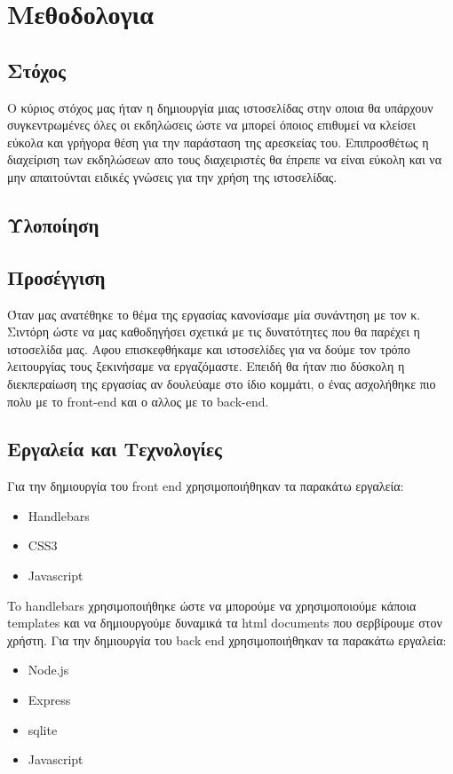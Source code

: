 \documentclass{acmart}
\begin{document}
\section{Μεθοδολογια}
\subsection{Στόχος}
Ο κύριος στόχος μας ήταν η δημιουργία μιας ιστοσελίδας στην οποια θα υπάρχουν συγκεντρωμένες όλες 
οι εκδηλώσεις ώστε να μπορεί όποιος επιθυμεί να κλείσει εύκολα και γρήγορα θέση για την παράσταση 
της αρεσκείας του. Επιπροσθέτως η διαχείριση των εκδηλώσεων απο τους διαχειριστές θα έπρεπε να είναι 
εύκολη και να μην απαιτούνται ειδικές γνώσεις για την χρήση της ιστοσελίδας.

\subsection{Υλοποίηση}
\subsection*{Προσέγγιση}
Όταν μας ανατέθηκε το θέμα της εργασίας κανονίσαμε μία συνάντηση με τον κ. Σιντόρη ώστε να μας 
καθοδηγήσει σχετικά με τις δυνατότητες που θα παρέχει η ιστοσελίδα μας. Αφου επισκεφθήκαμε και 
ιστοσελίδες για να δούμε τον τρόπο λειτουργίας τους ξεκινήσαμε να εργαζόμαστε. Επειδή θα ήταν 
πιο δύσκολη η διεκπεραίωση της εργασίας αν δουλεύαμε στο ίδιο κομμάτι, ο ένας ασχολήθηκε πιο πολυ 
με το front-end και ο αλλος με το back-end.

\subsection*{Εργαλεία και Τεχνολογίες}
Για την δημιουργία του front end χρησιμοποιήθηκαν τα παρακάτω εργαλεία:
\begin{itemize}
       \item Handlebars
       \item CSS3
       \item Javascript
\end{itemize}
To handlebars χρησιμοποιήθηκε ώστε να μπορούμε να χρησιμοποιούμε κάποια templates και να δημιουργούμε 
δυναμικά τα html documents που σερβίρουμε στον χρήστη.
Για την δημιουργία του back end χρησιμοποιήθηκαν τα παρακάτω εργαλεία:
\begin{itemize}
       \item Node.js
       \item Express
       \item sqlite
       \item Javascript
\end{itemize}
\end{document}
